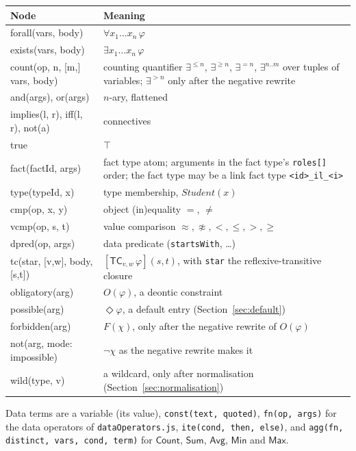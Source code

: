 \documentclass[11pt, a4paper]{article}
\newcommand{\code}[1]{\texttt{\color{codefg}#1}}
\begin{document}
\begin{center}
\small
\begin{tabularx}{\textwidth}{>{\ttfamily\color{codefg}}l X}
\toprule
\normalfont\textbf{Node} & \textbf{Meaning} \\
\midrule
forall(vars, body) & $\forall x_1 \ldots x_n\,\varphi$ \\
exists(vars, body) & $\exists x_1 \ldots x_n\,\varphi$ \\
count(op, n, [m,] vars, body) & counting quantifier $\exists^{\le n}$,
  $\exists^{\ge n}$, $\exists^{=n}$, $\exists^{n..m}$ over tuples of
  variables; $\exists^{>n}$ only after the negative rewrite \\
and(args), or(args) & $n$-ary, flattened \\
implies(l, r), iff(l, r), not(a) & connectives \\
true & $\top$ \\
fact(factId, args) & fact type atom; arguments in the fact type's
  \code{roles[]} order; the fact type may be a link fact type
  \code{<id>\_il\_<i>} \\
type(typeId, x) & type membership, $\mathit{Student}(x)$ \\
cmp(op, x, y) & object (in)equality $=$, $\neq$ \\
vcmp(op, s, t) & value comparison $\approx, \not\approx, <, \le, >, \ge$ \\
dpred(op, args) & data predicate (\code{startsWith}, \ldots) \\
tc(star, [v,w], body, [s,t]) & $[\mathsf{TC}_{v,w}\,\varphi](s,t)$, with
  \code{star} the reflexive-transitive closure \\
obligatory(arg) & $O(\varphi)$, a deontic constraint \\
possible(arg) & $\Diamond\varphi$, a default entry (Section~\ref{sec:default}) \\
forbidden(arg) & $F(\chi)$, only after the negative rewrite of $O(\varphi)$ \\
not(arg, mode: impossible) & $\neg\chi$ as the negative rewrite makes it \\
wild(type, v) & a wildcard, only after normalisation (Section~\ref{sec:normalisation}) \\
\bottomrule
\end{tabularx}
\end{center}

Data terms are a variable (its value), \code{const(text, quoted)},
\code{fn(op, args)} for the data operators of \code{dataOperators.js},
\code{ite(cond, then, else)}, and \code{agg(fn, distinct, vars, cond, term)}
for $\mathsf{Count}$, $\mathsf{Sum}$, $\mathsf{Avg}$, $\mathsf{Min}$ and
$\mathsf{Max}$.
\end{document}
